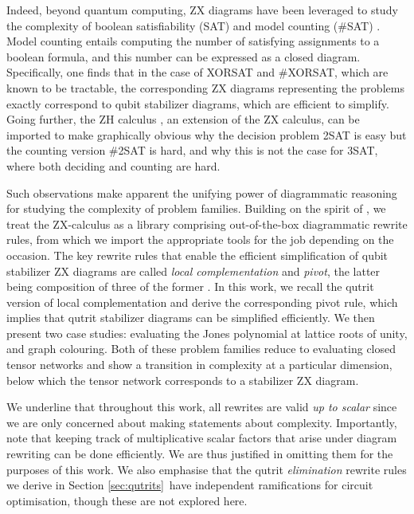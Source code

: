 Indeed, beyond quantum computing, ZX diagrams have been leveraged to study the complexity of boolean satisfiability (SAT) and model counting (\#SAT) \cite{debeaudrap2020tensor}.
Model counting entails computing the number of satisfying assignments to a boolean formula,
and this number can be expressed as a closed diagram.
Specifically, one finds that in the case of XORSAT and \#XORSAT,
which are known to be tractable,
the corresponding ZX diagrams representing the problems exactly correspond to qubit stabilizer diagrams, which are efficient to simplify.
Going further, the ZH calculus \cite{backens2018zh}, an extension of the ZX calculus, can be imported to make graphically obvious
why the decision problem 2SAT is easy but the counting version \#2SAT is hard, and why this is not the case for 3SAT, where both deciding and counting are hard.


Such observations make apparent the unifying power of diagrammatic reasoning
for studying the complexity of problem families.  
Building on the spirit of \cite{debeaudrap2020tensor}, we treat the ZX-calculus as a library comprising out-of-the-box diagrammatic rewrite rules, from which we import the appropriate tools for the job depending on the occasion.
The key rewrite rules that enable the efficient simplification
of qubit stabilizer ZX diagrams
are called \emph{local complementation} and \emph{pivot},
the latter being composition of three of the former \cite{graph_theoretic_simplification}.
In this work, we recall the qutrit version of local complementation and derive the corresponding pivot rule, 
which implies that qutrit stabilizer diagrams can be simplified efficiently.
We then present two case studies: evaluating the Jones polynomial at lattice roots of unity, and graph colouring.
Both of these problem families reduce to evaluating
closed tensor networks and show a transition in complexity
at a particular dimension, below which the tensor network corresponds to a stabilizer ZX diagram.

We underline that throughout this work, all rewrites are valid
\emph{up to scalar}
since we are only concerned about making statements about complexity.
Importantly, note that keeping track of multiplicative scalar factors that arise under diagram rewriting can be done efficiently.
We are thus justified in omitting them for the purposes of this work. We also emphasise that the qutrit \emph{elimination} rewrite rules we derive in Section \ref{sec:qutrits}\ have independent ramifications for circuit optimisation, though these are not explored here.
